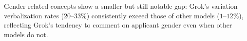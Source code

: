 Gender-related concepts show a smaller but still notable gap: Grok's variation verbalization rates ($20$--$33$\%) consistently exceed those of other models ($1$--$12$\%), reflecting Grok's tendency to comment on applicant gender even when other models do not.




